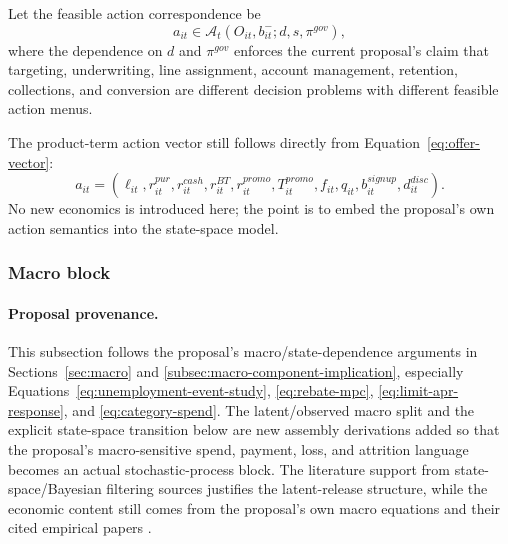 \documentclass[11pt]{article}
\newcommand{\1}{\mathbf{1}}
\begin{document}
Let the feasible action correspondence be
\begin{equation}
  a_{it}\in\mathcal{A}_{t}(O_{it},b_{it}^{-};d,s,\pi^{gov}),
  \label{eq:ss-feasible-actions}
\end{equation}
where the dependence on $d$ and $\pi^{gov}$ enforces the current proposal's
claim that targeting, underwriting, line assignment, account management,
retention, collections, and conversion are different decision problems with
different feasible action menus.

The product-term action vector still follows directly from
Equation~\eqref{eq:offer-vector}:
\begin{equation}
  a_{it}
  =
  (\ell_{it},r^{pur}_{it},r^{cash}_{it},r^{BT}_{it},r^{promo}_{it},
   T^{promo}_{it},f_{it},q_{it},b_{it}^{signup},d_{it}^{disc}).
  \label{eq:ss-action-vector}
\end{equation}
No new economics is introduced here; the point is to embed the proposal's own
action semantics into the state-space model.

\subsubsection{Macro block}
\label{subsec:state-space-macro-block}

\paragraph{Proposal provenance.}
This subsection follows the proposal's macro/state-dependence arguments in
Sections~\ref{sec:macro} and \ref{subsec:macro-component-implication},
especially Equations~\eqref{eq:unemployment-event-study},
\eqref{eq:rebate-mpc}, \eqref{eq:limit-apr-response}, and
\eqref{eq:category-spend}. The latent/observed macro split and the explicit
state-space transition below are new assembly derivations added so that the
proposal's macro-sensitive spend, payment, loss, and attrition language becomes
an actual stochastic-process block. The literature support from
state-space/Bayesian filtering sources justifies the latent-release structure,
while the economic content still comes from the proposal's own macro equations
and their cited empirical papers
\citep{durbinkoopman2012ssm,westharrison1997bfdm,
ganong2019unemployment,johnson2004rebates,gross2001liquidity,baker2020epidemic}.
\end{document}
